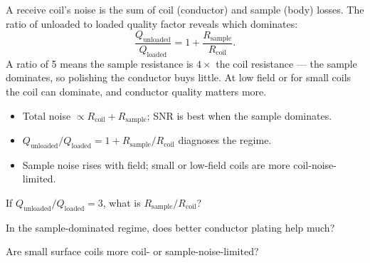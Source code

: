\begin{workedexample}
A receive coil's noise is the sum of coil (conductor) and sample (body)
losses. The ratio of unloaded to loaded quality factor reveals which dominates:
\[ \frac{Q_{\text{unloaded}}}{Q_{\text{loaded}}} = 1 + \frac{R_{\text{sample}}}{R_{\text{coil}}}. \]
A ratio of 5 means the sample resistance is $4\times$ the coil resistance --- the
sample dominates, so polishing the conductor buys little. At low field or for
small coils the coil can dominate, and conductor quality matters more.
\end{workedexample}

\begin{keytakeaways}
\begin{itemize}[leftmargin=1.4em,itemsep=2pt]
\item Total noise $\propto R_{\text{coil}} + R_{\text{sample}}$; SNR is best when the sample dominates.
\item $Q_{\text{unloaded}}/Q_{\text{loaded}} = 1 + R_{\text{sample}}/R_{\text{coil}}$ diagnoses the regime.
\item Sample noise rises with field; small or low-field coils are more coil-noise-limited.
\end{itemize}
\end{keytakeaways}

\begin{exercises}
\item If $Q_{\text{unloaded}}/Q_{\text{loaded}} = 3$, what is $R_{\text{sample}}/R_{\text{coil}}$?
\item In the sample-dominated regime, does better conductor plating help much?
\item Are small surface coils more coil- or sample-noise-limited?
\end{exercises}

